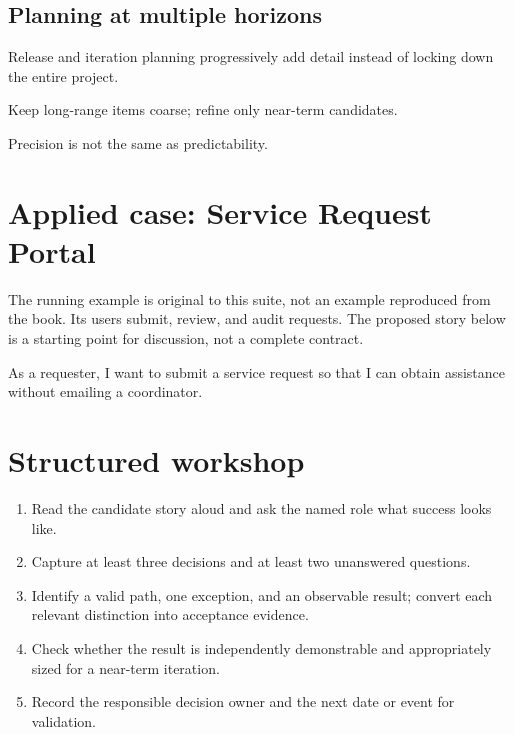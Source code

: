\documentclass[11pt,letterpaper]{article}
\begin{document}
\subsection{Planning at multiple horizons}
Release and iteration planning progressively add detail instead of locking down the entire project.

\begin{tcolorbox}[colback=tealback,colframe=navy,title={Engineering translation},breakable]
Keep long-range items coarse; refine only near-term candidates.

\end{tcolorbox}
\begin{tcolorbox}[colback=amberback,colframe=navy,title={Failure mode to watch},breakable]
Precision is not the same as predictability.

\end{tcolorbox}
\section{Applied case: Service Request Portal}
The running example is original to this suite, not an example reproduced from the book. Its users submit, review, and audit requests. The proposed story below is a starting point for discussion, not a complete contract.

\begin{tcolorbox}[colback=blueback,colframe=navy,title={Candidate story},breakable]
As a requester, I want to submit a service request so that I can obtain assistance without emailing a coordinator.

\end{tcolorbox}
\section{Structured workshop}
\begin{enumerate}[leftmargin=*,itemsep=3pt]
\item Read the candidate story aloud and ask the named role what success looks like.
\item Capture at least three decisions and at least two unanswered questions.
\item Identify a valid path, one exception, and an observable result; convert each relevant distinction into acceptance evidence.
\item Check whether the result is independently demonstrable and appropriately sized for a near-term iteration.
\item Record the responsible decision owner and the next date or event for validation.
\end{enumerate}
\end{document}
